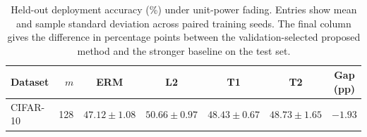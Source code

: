 \begin{table}[htb]
\centering
\caption{Held-out deployment accuracy (\%) under unit-power fading. Entries show mean and sample standard deviation across paired training seeds. The final column gives the difference in percentage points between the validation-selected proposed method and the stronger baseline on the test set.}
\label{tab:unit-power-sweep}
\begin{tabular}{lrccccc}
\toprule
Dataset & $m$ & ERM & L2 & T1 & T2 & Gap (pp) \\
\midrule
CIFAR-10 & 128 & $47.12\pm1.08$ & $\mathbf{50.66}\pm0.97$ & $48.43\pm0.67$ & $48.73\pm1.65$ & $-1.93$ \\
\bottomrule
\end{tabular}
\end{table}
